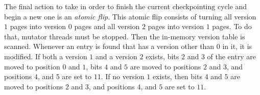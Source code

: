 The final action to take in order to finish the current checkpointing
cycle and begin a new one is an \emph{atomic flip}.  This atomic flip
consists of turning all version $1$ pages into version $0$ pages and
all version $2$ pages into version $1$ pages.  To do that, mutator
threads must be stopped.  Then the in-memory version table is scanned.
Whenever an entry is found that has a version other than $0$ in it, it
is modified.  If both a version $1$ and a version $2$ exists, bits $2$
and $3$ of the entry are moved to position $0$ and $1$, bits $4$ and
$5$ are moved to positions $2$ and $3$, and positions $4$, and $5$ are
set to $11$.  If no version $1$ exists, then bits $4$ and $5$ are
moved to positions $2$ and $3$, and positions $4$, and $5$ are set to
$11$.  

